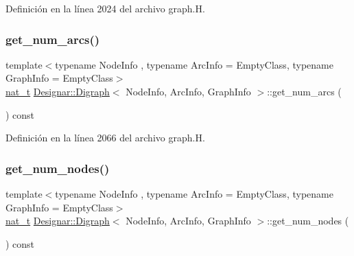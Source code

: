 Definición en la línea 2024 del archivo graph.\+H.

\mbox{\label{class_designar_1_1_digraph_aa6289acc079b48c3ebaead44a974d716}} 
\subsubsection{\texorpdfstring{get\+\_\+num\+\_\+arcs()}{get\_num\_arcs()}}
{\footnotesize\ttfamily template$<$typename Node\+Info , typename Arc\+Info  = Empty\+Class, typename Graph\+Info  = Empty\+Class$>$ \\
\hyperlink{namespace_designar_aa72662848b9f4815e7bf31a7cf3e33d1}{nat\+\_\+t} \hyperlink{class_designar_1_1_digraph}{Designar\+::\+Digraph}$<$ Node\+Info, Arc\+Info, Graph\+Info $>$\+::get\+\_\+num\+\_\+arcs (\begin{DoxyParamCaption}{ }\end{DoxyParamCaption}) const\hspace{0.3cm}{\ttfamily [inline]}}



Definición en la línea 2066 del archivo graph.\+H.

\mbox{\label{class_designar_1_1_digraph_a7e2f0b56ec85cfd63ff757bef58ae702}} 
\subsubsection{\texorpdfstring{get\+\_\+num\+\_\+nodes()}{get\_num\_nodes()}}
{\footnotesize\ttfamily template$<$typename Node\+Info , typename Arc\+Info  = Empty\+Class, typename Graph\+Info  = Empty\+Class$>$ \\
\hyperlink{namespace_designar_aa72662848b9f4815e7bf31a7cf3e33d1}{nat\+\_\+t} \hyperlink{class_designar_1_1_digraph}{Designar\+::\+Digraph}$<$ Node\+Info, Arc\+Info, Graph\+Info $>$\+::get\+\_\+num\+\_\+nodes (\begin{DoxyParamCaption}{ }\end{DoxyParamCaption}) const\hspace{0.3cm}{\ttfamily [inline]}}



